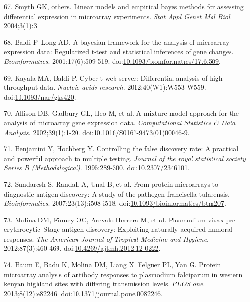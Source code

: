 \documentclass[]{article}
\begin{document}
\hypertarget{ref-smyth2004ebayes}{}
67. Smyth GK, others. Linear models and empirical bayes methods for
assessing differential expression in microarray experiments. \emph{Stat
Appl Genet Mol Biol}. 2004;3(1):3.

\hypertarget{ref-baldi2001cybert}{}
68. Baldi P, Long AD. A bayesian framework for the analysis of
microarray expression data: Regularized t-test and statistical
inferences of gene changes. \emph{Bioinformatics}. 2001;17(6):509-519.
doi:\href{https://doi.org/10.1093/bioinformatics/17.6.509}{10.1093/bioinformatics/17.6.509}.

\hypertarget{ref-kayala2012cyber}{}
69. Kayala MA, Baldi P. Cyber-t web server: Differential analysis of
high-throughput data. \emph{Nucleic acids research}.
2012;40(W1):W553-W559.
doi:\href{https://doi.org/10.1093/nar/gks420}{10.1093/nar/gks420}.

\hypertarget{ref-allison2002mmm}{}
70. Allison DB, Gadbury GL, Heo M, et al. A mixture model approach for
the analysis of microarray gene expression data. \emph{Computational
Statistics \& Data Analysis}. 2002;39(1):1-20.
doi:\href{https://doi.org/10.1016/S0167-9473(01)00046-9}{10.1016/S0167-9473(01)00046-9}.

\hypertarget{ref-benjamini1995fdr}{}
71. Benjamini Y, Hochberg Y. Controlling the false discovery rate: A
practical and powerful approach to multiple testing. \emph{Journal of
the royal statistical society Series B (Methodological)}. 1995:289-300.
doi:\href{https://doi.org/10.2307/2346101}{10.2307/2346101}.

\hypertarget{ref-sundaresh2007}{}
72. Sundaresh S, Randall A, Unal B, et al. From protein microarrays to
diagnostic antigen discovery: A study of the pathogen francisella
tularensis. \emph{Bioinformatics}. 2007;23(13):i508-i518.
doi:\href{https://doi.org/10.1093/bioinformatics/btm207}{10.1093/bioinformatics/btm207}.

\hypertarget{ref-molina2012}{}
73. Molina DM, Finney OC, Arevalo-Herrera M, et al. Plasmodium vivax
pre-erythrocytic--Stage antigen discovery: Exploiting naturally acquired
humoral responses. \emph{The American Journal of Tropical Medicine and
Hygiene}. 2012;87(3):460-469.
doi:\href{https://doi.org/10.4269/ajtmh.2012.12-0222}{10.4269/ajtmh.2012.12-0222}.

\hypertarget{ref-baum2013}{}
74. Baum E, Badu K, Molina DM, Liang X, Felgner PL, Yan G. Protein
microarray analysis of antibody responses to plasmodium falciparum in
western kenyan highland sites with differing transmission levels.
\emph{PLOS one}. 2013;8(12):e82246.
doi:\href{https://doi.org/10.1371/journal.pone.0082246}{10.1371/journal.pone.0082246}.
\end{document}
